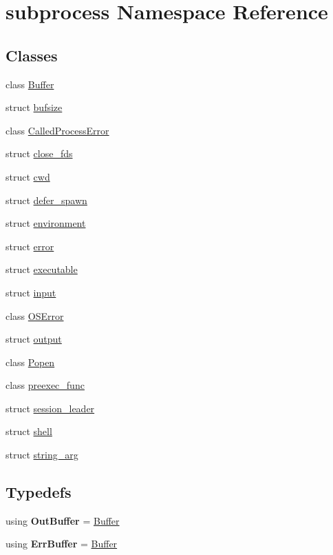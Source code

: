 \hypertarget{namespacesubprocess}{}\section{subprocess Namespace Reference}
\label{namespacesubprocess}
\subsection*{Classes}
\begin{DoxyCompactItemize}
\item 
class \hyperlink{classsubprocess_1_1Buffer}{Buffer}
\item 
struct \hyperlink{structsubprocess_1_1bufsize}{bufsize}
\item 
class \hyperlink{classsubprocess_1_1CalledProcessError}{Called\+Process\+Error}
\item 
struct \hyperlink{structsubprocess_1_1close__fds}{close\+\_\+fds}
\item 
struct \hyperlink{structsubprocess_1_1cwd}{cwd}
\item 
struct \hyperlink{structsubprocess_1_1defer__spawn}{defer\+\_\+spawn}
\item 
struct \hyperlink{structsubprocess_1_1environment}{environment}
\item 
struct \hyperlink{structsubprocess_1_1error}{error}
\item 
struct \hyperlink{structsubprocess_1_1executable}{executable}
\item 
struct \hyperlink{structsubprocess_1_1input}{input}
\item 
class \hyperlink{classsubprocess_1_1OSError}{O\+S\+Error}
\item 
struct \hyperlink{structsubprocess_1_1output}{output}
\item 
class \hyperlink{classsubprocess_1_1Popen}{Popen}
\item 
class \hyperlink{classsubprocess_1_1preexec__func}{preexec\+\_\+func}
\item 
struct \hyperlink{structsubprocess_1_1session__leader}{session\+\_\+leader}
\item 
struct \hyperlink{structsubprocess_1_1shell}{shell}
\item 
struct \hyperlink{structsubprocess_1_1string__arg}{string\+\_\+arg}
\end{DoxyCompactItemize}
\subsection*{Typedefs}
\begin{DoxyCompactItemize}
\item 
\mbox{\label{namespacesubprocess_a7753c731a00d832f572a6814ce9b13ee}} 
using {\bfseries Out\+Buffer} = \hyperlink{classsubprocess_1_1Buffer}{Buffer}
\item 
\mbox{\label{namespacesubprocess_a965118ad09e742f42019863b030efb24}} 
using {\bfseries Err\+Buffer} = \hyperlink{classsubprocess_1_1Buffer}{Buffer}
\end{DoxyCompactItemize}
